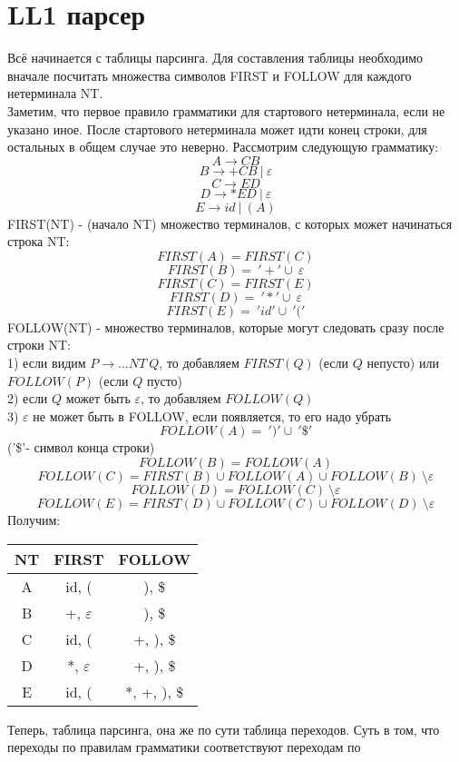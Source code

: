 \documentclass{article}
\begin{document}
\part{LL1 парсер}
Всё начинается с таблицы парсинга. Для составления таблицы необходимо вначале 
посчитать множества символов FIRST и FOLLOW для каждого нетерминала NT. 
\\Заметим, что первое правило грамматики для стартового нетерминала, 
если не указано иное. После стартового нетерминала может 
идти конец строки, для остальных в общем случае это неверно.
Рассмотрим следующую грамматику:
$$A \to CB $$
$$B \to +CB \ | \ \varepsilon $$
$$C \to ED $$
$$D \to *ED \ | \ \varepsilon$$
$$E \to id \ | \ (A)$$
FIRST(NT) - (начало NT) множество терминалов, с которых может начинаться строка NT:\\
$$FIRST(A)=FIRST(C)$$
$$FIRST(B)=\ '+' \cup \ \varepsilon$$
$$FIRST(C)=FIRST(E)$$
$$FIRST(D)=\ '*' \cup \ \varepsilon$$
$$FIRST(E)=\ 'id' \cup \ '('$$
FOLLOW(NT) - множество терминалов, которые могут следовать сразу после строки NT:\\ 
1) если видим $P \to ... NT \ Q$, то 
добавляем $FIRST(Q)$ (если $Q$ непусто) или $FOLLOW(P)$ (если $Q$ пусто) \\
2) если $Q$ может быть $\varepsilon$, то добавляем $FOLLOW(Q)$ \\
3) $\varepsilon$ не может быть в FOLLOW, если появляется, то его надо убрать
$$FOLLOW(A)=\ ')' \cup \ '\$'$$  ('\$'- символ конца строки)
$$FOLLOW(B)=FOLLOW(A)$$
$$FOLLOW(C)=FIRST(B) \cup FOLLOW(A) \cup FOLLOW(B)\ \setminus \varepsilon$$
$$FOLLOW(D)=FOLLOW(C) \ \setminus \varepsilon$$
$$FOLLOW(E)=FIRST(D) \cup FOLLOW(C) \cup FOLLOW(D)\ \setminus \varepsilon$$
Получим:\\
\begin{center}
  \begin{tabular}{ c|c|c }
    NT & FIRST & FOLLOW         \\
    \hline
    A &  id, ( & ), \$          \\
    \hline
    B &  +, $\varepsilon$ & ), \$    \\
    \hline
    C &  id, ( & +, ), \$       \\
    \hline
    D &  *, $\varepsilon$ & +, ), \$ \\
    \hline
    E &  id, ( & *, +, ), \$ 
  \end{tabular}
\end{center}
Теперь, таблица парсинга, она же по сути таблица переходов. Суть в том, 
что переходы по правилам грамматики соответствуют переходам по 
\end{document}
